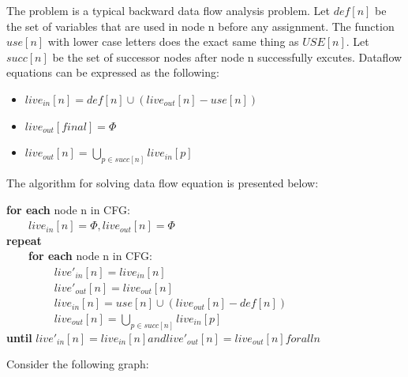 \documentclass[12pt]{article}
\begin{document}
The problem is a typical backward data flow analysis problem. Let
$def[n]$ be the set of variables that are used in node n before any
assignment. The function $use[n]$ with lower case letters does the
exact same thing as $USE[n]$. Let $succ[n]$ be the set of successor nodes
after node n successfully excutes. Dataflow equations can be expressed as the following:
\begin{itemize}
\item $live_{in}[n] = def[n] \cup (live_{out}[n] - use[n])$
\item$live_{out}[final] = \Phi$
\item$live_{out}[n] =\bigcup_{p\in succ[n]}live_{in}[p] $
\end{itemize}


The algorithm for solving data flow equation is presented below:


{\bf for each} node n in CFG:\\
\indent
~~~~$live_{in}[n] = \Phi, live_{out}[n] = \Phi$\\
\indent
{\bf repeat}\\
\indent
~~~~{\bf for each} node n in CFG:\\
\indent
~~~~~~~~ $ live'_{in}[n] = live_{in}[n]$\\
\indent
~~~~~~~~ $ live'_{out}[n] = live_{out}[n]$\\
\indent
~~~~~~~~ $ live_{in}[n] = use[n] \cup (live_{out}[n] - def[n])$\\
\indent
~~~~~~~~ $live_{out}[n] =\bigcup_{p\in succ[n]}live_{in}[p] $\\
\indent
{\bf until }$live'_{in}[n] = live_{in}[n]  and live'_{out}[n] =
  live_{out}[n] for all n $




Consider the following graph:
\end{document}
